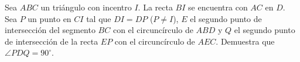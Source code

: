 Sea $ABC$ un triángulo con incentro $I$. La recta $BI$ se encuentra con $AC$ en $D$. Sea $P$ un punto en $CI$ tal que $DI=DP$ ($P\ne I$), $E$ el segundo punto de intersección del segmento $BC$ con el circuncírculo de $ABD$ y $Q$ el segundo punto de intersección de la recta $EP$ con el circuncírculo de $AEC$. Demuestra que $\angle PDQ=90^\circ$.
